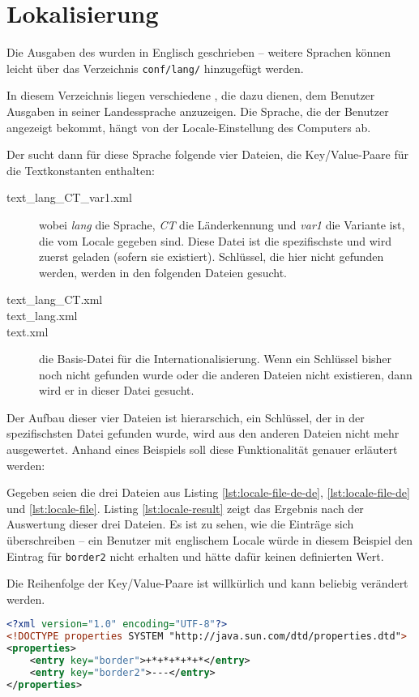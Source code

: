 \section{Lokalisierung}
\label{lokalisierung}
Die Ausgaben des \md{} wurden in Englisch geschrieben -- weitere Sprachen können leicht über das Verzeichnis \texttt{conf/lang/} hinzugefügt werden.

In diesem Verzeichnis liegen verschiedene , die dazu dienen, dem Benutzer Ausgaben in seiner Landessprache anzuzeigen. Die Sprache, die der Benutzer angezeigt bekommt, hängt von der Locale-Einstellung des Computers ab.

Der \md{} sucht dann für diese Sprache folgende vier Dateien, die Key/Value-Paare für die Textkonstanten enthalten:
\begin{description}
\item[text_lang_CT_var1.xml] wobei \emph{lang} die Sprache, \emph{CT} die Länderkennung und \emph{var1} die Variante ist, die vom Locale gegeben sind. Diese Datei ist die spezifischste und wird zuerst geladen (sofern sie existiert). Schlüssel, die hier nicht gefunden werden, werden in den folgenden Dateien gesucht.
\item[text_lang_CT.xml]
\item[text_lang.xml]
\item[text.xml] die Basis-Datei für die Internationalisierung. Wenn ein Schlüssel bisher noch nicht gefunden wurde oder die anderen Dateien nicht existieren, dann wird er in dieser Datei gesucht.
\end{description}

Der Aufbau dieser vier Dateien ist hierarschich, ein Schlüssel, der in der spezifischsten Datei gefunden wurde, wird aus den anderen Dateien nicht mehr ausgewertet. Anhand eines Beispiels soll diese Funktionalität genauer erläutert werden:

Gegeben seien die drei Dateien aus Listing \ref{lst:locale-file-de-de}, \ref{lst:locale-file-de} und \ref{lst:locale-file}. Listing \ref{lst:locale-result} zeigt das Ergebnis nach der Auswertung dieser drei Dateien. Es ist zu sehen, wie die Einträge sich überschreiben -- ein Benutzer mit englischem Locale würde in diesem Beispiel den Eintrag für \texttt{border2} nicht erhalten und hätte dafür keinen definierten Wert.

Die Reihenfolge der Key/Value-Paare ist willkürlich und kann beliebig verändert werden.

\begin{lstlisting}[language=XML,caption={Beispiel für Datei \texttt{text_de_DE.xml}},label=lst:locale-file-de-de]
<?xml version="1.0" encoding="UTF-8"?>
<!DOCTYPE properties SYSTEM "http://java.sun.com/dtd/properties.dtd">
<properties>
	<entry key="border">+*+*+*+*+*</entry>
	<entry key="border2">---</entry>
</properties>
\end{lstlisting}

